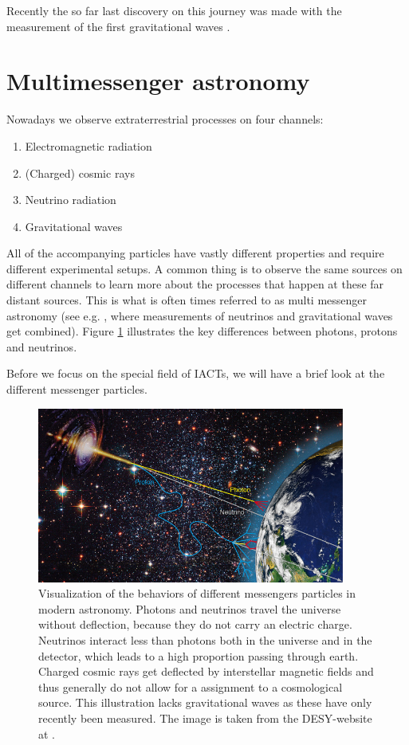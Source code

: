 Recently the so far last discovery on this journey
was made with the measurement of the first gravitational 
waves \cite{PhysRevLett.118.221101}.

\section{Multimessenger astronomy}

Nowadays we observe extraterrestrial processes on four channels: 
\begin{enumerate}
	\item Electromagnetic radiation
	\item (Charged) cosmic rays
	\item Neutrino radiation
	\item Gravitational waves
\end{enumerate}

All of the accompanying particles have vastly different
properties and require different experimental setups.
A common thing is to observe the same sources 
on different channels to learn more about the processes that happen at 
these far distant sources. This is what is often times 
referred to as multi messenger astronomy (see e.g. \cite{RevModPhys.85.1401}, where
measurements of neutrinos and gravitational waves get combined).
Figure \ref{fig:multi_messenger} illustrates the key differences between
photons, protons and neutrinos.

Before we focus on the special field of IACTs, we will have
a brief look at the different messenger particles.

\begin{figure}
	\centering
	\captionsetup{width=0.9\linewidth}
	\includegraphics[width=0.9\textwidth]{images/astro-web-titel.jpg}
	\caption{Visualization of the behaviors of different messengers
		particles in modern astronomy.
		Photons and neutrinos travel the universe without deflection,
		because they do not carry an electric charge.
		Neutrinos interact less than photons both in the universe and in the detector,
		which leads to a high proportion passing through earth.
		Charged cosmic rays get deflected by interstellar
		magnetic fields and thus generally do not allow for a assignment to a cosmological source.
		This illustration lacks gravitational waves 
		as these have only recently been measured.
		The image is taken from the DESY-website at \cite{desy_mm_astro}.
	}
	\label{fig:multi_messenger}
\end{figure}



